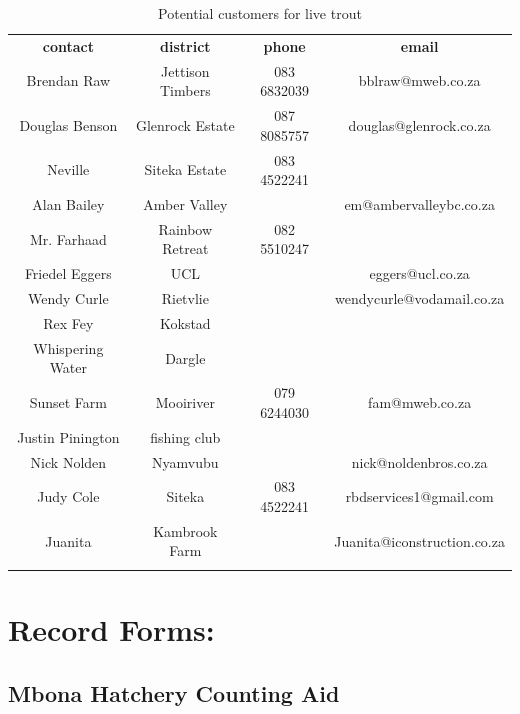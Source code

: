 \begin{appendices}
\begin{table}[H]
  \centering
 \begin{tabular}{|c|c|c|c|}
 \thickhline
   {\bf contact} & {\bf district} & {\bf phone} & {\bf email}  \\ \thickhline
    Brendan Raw & Jettison Timbers & 083 6832039  & bblraw@mweb.co.za \\ \hline 
     Douglas Benson & Glenrock Estate & 087 8085757 & douglas@glenrock.co.za \\ \hline
     Neville & Siteka Estate & 083 4522241 & \\ \hline
    Alan Bailey & Amber Valley & & em@ambervalleybc.co.za\\ \hline
    Mr. Farhaad & Rainbow Retreat & 082 5510247 & \\ \hline
    Friedel Eggers & UCL &  & eggers@ucl.co.za \\ \hline
    Wendy Curle & Rietvlie &  & wendycurle@vodamail.co.za\\ \hline
    Rex Fey & Kokstad &  & \\ \hline
     Whispering Water & Dargle &  & \\ \hline
     Sunset Farm & Mooiriver & 079 6244030 & fam@mweb.co.za \\ \hline
     Justin Pinington & fishing club & & \\ \hline
      Nick Nolden & Nyamvubu & & nick@noldenbros.co.za \\ \hline
     Judy Cole & Siteka & 083 4522241 & rbdservices1@gmail.com \\ \hline
     Juanita & Kambrook Farm & & Juanita@iconstruction.co.za \\ \hline
                   \thickhline
  \end{tabular} 
  \caption{Potential customers for live trout}
  \label{tab:CustomerContactDetails}
\end{table}

\newpage

\section{Record Forms:}

\clearpage\pagestyle{empty}
\begin{landscape}

\subsection{Mbona Hatchery Counting Aid}



\end{landscape}
\end{appendices}
